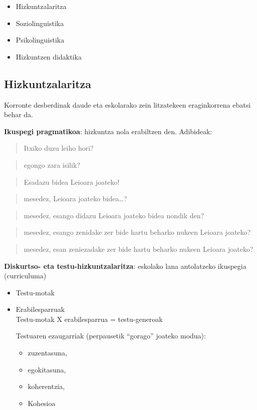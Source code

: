 \documentclass[
]{book}
\providecommand{\tightlist}{%
  \setlength{\itemsep}{0pt}\setlength{\parskip}{0pt}}
\begin{document}
\begin{itemize}
\tightlist
\item
  Hizkuntzalaritza
\item
  Soziolinguistika
\item
  Psikolinguistika
\item
  Hizkuntzen didaktika
\end{itemize}

\hypertarget{hizkuntzalaritza}{%
\subsection{Hizkuntzalaritza}\label{hizkuntzalaritza}}

Korronte desberdinak daude eta eskolarako zein litzatekeen eraginkorrena ebatsi behar da.

\textbf{Ikuspegi pragmatikoa}: hizkuntza nola erabiltzen den. Adibideak:

\begin{quote}
Itxiko duzu leiho hori?
\end{quote}

\begin{quote}
egongo zara isilik?
\end{quote}

\begin{quote}
Esadazu bidea Leioara joateko!
\end{quote}

\begin{quote}
mesedez, Leioara joateko bidea\ldots?
\end{quote}

\begin{quote}
mesedez, esango didazu Leioara joateko bidea nondik den?
\end{quote}

\begin{quote}
mesedez, esango zenidake zer bide hartu beharko nukeen Leioara joateko?
\end{quote}

\begin{quote}
mesedez, esan zeniezadake zer bide hartu beharko nukeen Leioara joateko?
\end{quote}

\textbf{Diskurtso- eta testu-hizkuntzalaritza}: eskolako lana antolatzeko ikuspegia (curriculuma)

\begin{itemize}
\item
  Testu-motak
\item
  Erabilesparruak\\
  Testu-motak X erabilesparrua = testu-generoak

  Testuaren ezaugarriak (perpausetik ``gorago'' joateko modua):

  \begin{itemize}
  \tightlist
  \item
    zuzentasuna,
  \item
    egokitasuna,
  \item
    koherentzia,
  \item
    Kohesioa
  \end{itemize}
\end{itemize}
\end{document}

